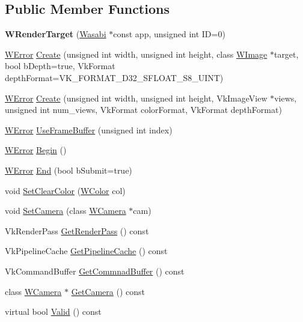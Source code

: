 \subsection*{Public Member Functions}
\begin{DoxyCompactItemize}
\item 
{\bfseries W\+Render\+Target} (\hyperlink{class_wasabi}{Wasabi} $\ast$const app, unsigned int ID=0)\hypertarget{class_w_render_target_aa3193e686f69b5ac8b3821f66961960a}{}\label{class_w_render_target_aa3193e686f69b5ac8b3821f66961960a}

\item 
\hyperlink{class_w_error}{W\+Error} \hyperlink{class_w_render_target_a4add3962dd66d44afef07a8369a9a369}{Create} (unsigned int width, unsigned int height, class \hyperlink{class_w_image}{W\+Image} $\ast$target, bool b\+Depth=true, Vk\+Format depth\+Format=V\+K\+\_\+\+F\+O\+R\+M\+A\+T\+\_\+\+D32\+\_\+\+S\+F\+L\+O\+A\+T\+\_\+\+S8\+\_\+\+U\+I\+NT)
\item 
\hyperlink{class_w_error}{W\+Error} \hyperlink{class_w_render_target_afd4e209874b0d57f3835d965219524ed}{Create} (unsigned int width, unsigned int height, Vk\+Image\+View $\ast$views, unsigned int num\+\_\+views, Vk\+Format color\+Format, Vk\+Format depth\+Format)
\item 
\hyperlink{class_w_error}{W\+Error} \hyperlink{class_w_render_target_a1110348b8fb60a856f4021acfbd40523}{Use\+Frame\+Buffer} (unsigned int index)
\item 
\hyperlink{class_w_error}{W\+Error} \hyperlink{class_w_render_target_a0702142781a9d85df02f7fe032401956}{Begin} ()
\item 
\hyperlink{class_w_error}{W\+Error} \hyperlink{class_w_render_target_abfd66b4b2d515afa49b50931f6593608}{End} (bool b\+Submit=true)
\item 
void \hyperlink{class_w_render_target_acfa19fb6b4cde2583b4e033436d29327}{Set\+Clear\+Color} (\hyperlink{class_w_color}{W\+Color} col)
\item 
void \hyperlink{class_w_render_target_a232081b0e953993dbedf3d647f900a92}{Set\+Camera} (class \hyperlink{class_w_camera}{W\+Camera} $\ast$cam)
\item 
Vk\+Render\+Pass \hyperlink{class_w_render_target_a059363651803990bb775610814ee2a3b}{Get\+Render\+Pass} () const 
\item 
Vk\+Pipeline\+Cache \hyperlink{class_w_render_target_a3058918a5781515e879d223f5bfc1269}{Get\+Pipeline\+Cache} () const 
\item 
Vk\+Command\+Buffer \hyperlink{class_w_render_target_a874520933dec63ca3ceeadb209f07628}{Get\+Commnad\+Buffer} () const 
\item 
class \hyperlink{class_w_camera}{W\+Camera} $\ast$ \hyperlink{class_w_render_target_a9387870adbd5924c46b003f8c17c4a59}{Get\+Camera} () const 
\item 
virtual bool \hyperlink{class_w_render_target_a47887a7010f64e5c16634d47eb6923a9}{Valid} () const 
\end{DoxyCompactItemize}
